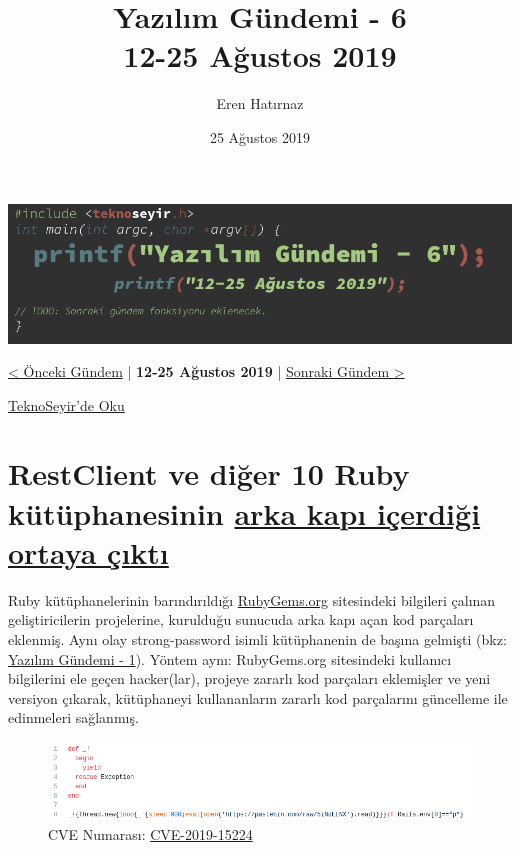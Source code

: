 \documentclass[11pt]{article}
\author{Eren Hatırnaz}
\date{25 Ağustos 2019}
\title{Yazılım Gündemi - 6\\\medskip
\large 12-25 Ağustos 2019}
\begin{document}
\maketitle
\tableofcontents \clearpage\shorthandoff{=}

\begin{center}
\includegraphics[width=.9\linewidth]{gorseller/yazilim-gundemi-banner.png}
\end{center}
\begin{center}
\href{../05/yazilim-gundemi-05.pdf}{< Önceki Gündem} | \textbf{12-25 Ağustos 2019} | \href{../07/yazilim-gundemi-07.pdf}{Sonraki Gündem >}

\href{https://teknoseyir.com/blog/yazilim-gundemi-6-12-25-agustos-2019}{TeknoSeyir'de Oku}
\end{center}

\section{RestClient ve diğer 10 Ruby kütüphanesinin \href{https://www.zdnet.com/article/backdoor-code-found-in-11-ruby-libraries/}{arka kapı içerdiği ortaya çıktı}}
\label{sec:org7fddd85}
Ruby kütüphanelerinin barındırıldığı \href{https://rubygems.org}{RubyGems.org} sitesindeki bilgileri çalınan
geliştiricilerin projelerine, kurulduğu sunucuda arka kapı açan kod parçaları
eklenmiş. Aynı olay strong-password isimli kütüphanenin de başına gelmişti
(bkz: \href{../01/yazilim-gundemi-01.pdf}{Yazılım Gündemi - 1}). Yöntem aynı: RubyGems.org sitesindeki kullanıcı
bilgilerini ele geçen hacker(lar), projeye zararlı kod parçaları eklemişler ve
yeni versiyon çıkarak, kütüphaneyi kullananların zararlı kod parçalarını
güncelleme ile edinmeleri sağlanmış.

\begin{figure}[htbp]
\centering
\includegraphics[width=.9\linewidth]{gorseller/ruby-zararli-kod.png}
\caption{CVE Numarası: \href{https://nvd.nist.gov/vuln/detail/CVE-2019-15224}{CVE-2019-15224}}
\end{figure}
\end{document}
